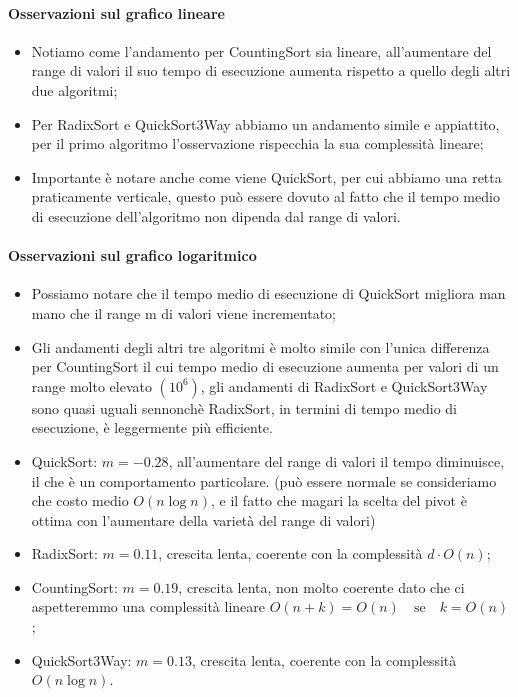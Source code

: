 \documentclass[a4paper, 11pt]{article}
\begin{document}
\paragraph{Osservazioni sul grafico lineare}
\begin{itemize}
  \item Notiamo come l'andamento per CountingSort sia lineare, all'aumentare del range di valori il suo tempo di esecuzione aumenta rispetto a quello degli altri due algoritmi;
  \item Per RadixSort e QuickSort3Way abbiamo un andamento simile e appiattito, per il primo algoritmo l'osservazione rispecchia la sua complessità lineare;
  \item Importante è notare anche come viene QuickSort, per cui abbiamo una retta praticamente verticale, questo può essere dovuto al fatto che il tempo medio di esecuzione dell'algoritmo non dipenda dal range di valori.
\end{itemize}

\paragraph{Osservazioni sul grafico logaritmico}
\begin{itemize}
  \item Possiamo notare che il tempo medio di esecuzione di QuickSort migliora man mano che il range m di valori viene incrementato;
  \item Gli andamenti degli altri tre algoritmi è molto simile con l'unica differenza per CountingSort il cui tempo medio di esecuzione aumenta per valori di un range molto elevato $(10^6)$, gli andamenti di RadixSort e QuickSort3Way sono quasi uguali sennonchè RadixSort, in termini
  di tempo medio di esecuzione, è leggermente più efficiente.
  \item QuickSort: $m=-0.28$, all'aumentare del range di valori il tempo diminuisce, il che è un comportamento particolare. 
  (può essere normale se consideriamo che costo medio $O(n \log n)$, e il fatto che magari la scelta del pivot è ottima con l'aumentare della varietà del range di valori)
  \item RadixSort: $m=0.11$, crescita lenta, coerente con la complessità $d \cdot O(n)$;
  \item CountingSort: $m=0.19$, crescita lenta, non molto coerente dato che ci aspetteremmo una complessità lineare $O(n + k) = O(n) \quad \text{se} \quad k = O(n)$;
  \item QuickSort3Way: $m=0.13$, crescita lenta, coerente con la complessità $O(n \log n)$.
\end{itemize}
\end{document}
